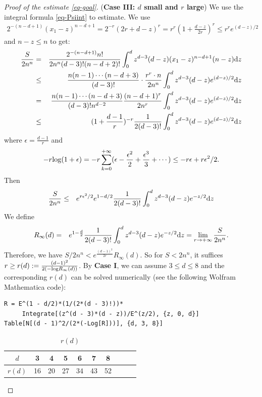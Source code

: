 \documentclass[12pt]{amsart}
\theoremstyle{definition}
\def\lim{{\rm lim}}
\def\dif{{\rm d}}
\def\log{{\rm log}}
\begin{document}
\begin{proof}[Proof of the estimate \eqref{eq-goal}]
(\textbf{Case III: $d$ small and $r$ large})
We use the integral formula \eqref{eq-Psiint} to estimate.
We use 
\begin{eqnarray*}
2^{-(n-d+1)}(x_1-z)^{n-d+1}=2^{-r}(2r+d-z)^r=r^r (1+\frac{d-z}{2r})^r\le r^r e^{(d-z)/2}
\end{eqnarray*}
and $n-z\le n$ to get:
\begin{eqnarray*}
    \frac{S}{2n^n}&=&\frac{2^{-(n-d+1)}n!}{2n^n (d-3)!(n-d+2)!}\int_0^d z^{d-3}(d-z)(x_1-z)^{n-d+1}(n-z)\dif z\\
    &\le& \frac{n(n-1)\cdots (n-d+3)}{(d-3)!}\cdot \frac{r^r\cdot n}{2n^n}\int_0^d z^{d-3}(d-z) e^{(d-z)/2}\dif z\\
    &=& \frac{n(n-1)\cdots (n-d+3)}{(d-3)!n^{d-2}}\frac{(n-d+1)^r}{2 n^r}\int_0^d z^{d-3}(d-z) e^{(d-z)/2}\dif z\\
    &\le& (1+\frac{d-1}{r})^{-r}\frac{1}{2(d-3)!}\int_0^d z^{d-3}(d-z) e^{(d-z)/2}\dif z
    \end{eqnarray*}
    where $\epsilon=\frac{d-1}{r}$ and 
    \begin{eqnarray*}
    -r \log(1+\epsilon)=-r \sum_{k=0}^{+\infty} (\epsilon-\frac{\epsilon^2}{2}+\frac{\epsilon^3}{3}+\cdots)\le -r\epsilon+r \epsilon^2/2.
\end{eqnarray*}
Then
 \begin{eqnarray*}
    \frac{S}{2n^n}&\le& e^{r \epsilon^2/2}e^{1-d/2}\frac{1}{2(d-3)!}\int_0^d z^{d-3}(d-z)e^{-z/2}\dif z
\end{eqnarray*}
We define
\begin{eqnarray*}
    R_\infty(d)&=&e^{1-\frac{d}{2}}\frac{1}{2(d-3)!}\int_0^d z^{d-3}(d-z)e^{-z/2}\dif z=\mathop{\lim}_{r\rightarrow+\infty} \frac{S}{2n^n}. 
\end{eqnarray*}
Therefore, we have $S/2n^n< e^{\frac{(d-1)^2}{2r}}R_\infty(d)$. So for $S< 2n^n$, it suffices $r\ge r(d):=\frac{(d-1)^2}{2(-\log R_\infty(d))}$. By \textbf{Case I}, we can assume $3\le d\le 8$ and the corresponding $r(d)$ can be solved numerically (see the following Wolfram Mathematica code): 
\begin{lstlisting}
R = E^(1 - d/2)*(1/(2*(d - 3)!))*
     Integrate[(z^(d - 3)*(d - z))/E^(z/2), {z, 0, d}]
Table[N[(d - 1)^2/(2*(-Log[R]))], {d, 3, 8}]
\end{lstlisting}
\begin{table}[!htp]
\caption{$r(d)$}
    \label{tab:r(d)}
    \centering
\begin{tabular}{|c|c|c|c|c|c|c|c|c|c|}
\hline
   $d$ & 3 & 4 & 5& 6& 7 & 8\\
   \hline
   $r(d)$ & 16 & 20 & 27 & 34 & 43 & 52\\
   \hline
\end{tabular}    
\end{table}



\end{proof}
\end{document}
